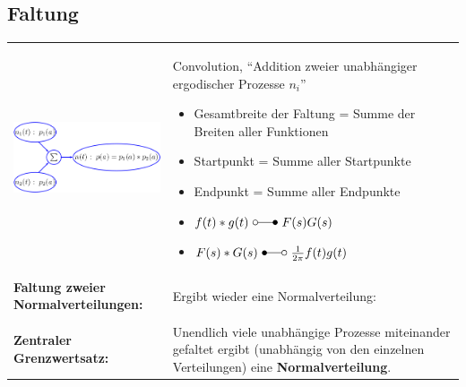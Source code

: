 	\subsection{Faltung }
		\begin{tabularx}{\textwidth}{lX}
			\parbox{5cm}{
				\includegraphics[width=5cm]{./bilder/faltung.png}
			}
			& 	\parbox{13cm}{
				Convolution, ``Addition zweier unabhängiger ergodischer Prozesse $n_i$'' \\
				 \\
				
				\begin{itemize}
					\item Gesamtbreite der Faltung = Summe der Breiten aller Funktionen
					\item Startpunkt = Summe aller Startpunkte
					\item Endpunkt = Summe aller Endpunkte
					\item $f(t) * g(t) \ \laplace \ F(s) G(s)$
					\item $F(s) * G(s) \ \Laplace \ \frac{1}{2 \pi} f(t) g(t)$
				\end{itemize}
			}
			\\
			\textbf{Faltung zweier Normalverteilungen:}
			&
			Ergibt wieder eine Normalverteilung: \newline
			\\ & \\
			\textbf{Zentraler Grenzwertsatz:}
			&	Unendlich viele unabhängige Prozesse miteinander gefaltet ergibt
			(unabhängig von den einzelnen Verteilungen) eine \textbf{Normalverteilung}.
		\end{tabularx}
	
